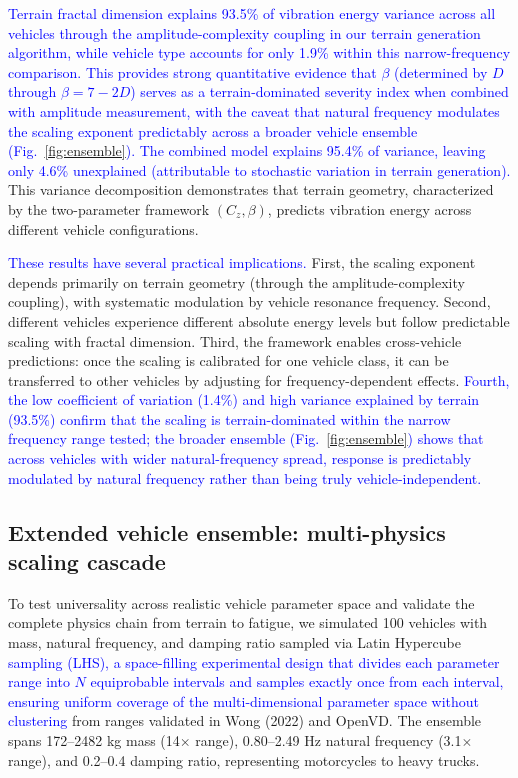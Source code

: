 \documentclass[11pt]{article}
\begin{document}
\textcolor{blue}{Terrain fractal dimension explains 93.5\% of vibration energy variance across all vehicles through the amplitude-complexity coupling in our terrain generation algorithm, while vehicle type accounts for only 1.9\% within this narrow-frequency comparison. This provides strong quantitative evidence that $\beta$ (determined by $D$ through $\beta = 7-2D$) serves as a terrain-dominated severity index when combined with amplitude measurement, with the caveat that natural frequency modulates the scaling exponent predictably across a broader vehicle ensemble (Fig.~\ref{fig:ensemble}). The combined model explains 95.4\% of variance, leaving only 4.6\% unexplained (attributable to stochastic variation in terrain generation).} This variance decomposition demonstrates that terrain geometry, characterized by the two-parameter framework $(C_z, \beta)$, predicts vibration energy across different vehicle configurations.

\textcolor{blue}{These results have several practical implications.} First, the scaling exponent depends primarily on terrain geometry (through the amplitude-complexity coupling), with systematic modulation by vehicle resonance frequency. Second, different vehicles experience different absolute energy levels but follow predictable scaling with fractal dimension. Third, the framework enables cross-vehicle predictions: once the scaling is calibrated for one vehicle class, it can be transferred to other vehicles by adjusting for frequency-dependent effects. \textcolor{blue}{Fourth, the low coefficient of variation (1.4\%) and high variance explained by terrain (93.5\%) confirm that the scaling is terrain-dominated within the narrow frequency range tested; the broader ensemble (Fig.~\ref{fig:ensemble}) shows that across vehicles with wider natural-frequency spread, response is predictably modulated by natural frequency rather than being truly vehicle-independent.}


\subsection*{Extended vehicle ensemble: multi-physics scaling cascade}

To test universality across realistic vehicle parameter space and validate the complete physics chain from terrain to fatigue, we simulated 100 vehicles with mass, natural frequency, and damping ratio sampled via Latin Hypercube \textcolor{blue}{sampling (LHS), a space-filling experimental design that divides each parameter range into $N$ equiprobable intervals and samples exactly once from each interval, ensuring uniform coverage of the multi-dimensional parameter space without clustering\cite{McKay1979}} from ranges validated in Wong (2022)\cite{Wong2022} and OpenVD. The ensemble spans 172--2482 kg mass (14$\times$ range), 0.80--2.49 Hz natural frequency (3.1$\times$ range), and 0.2--0.4 damping ratio, representing motorcycles to heavy trucks.
\end{document}

